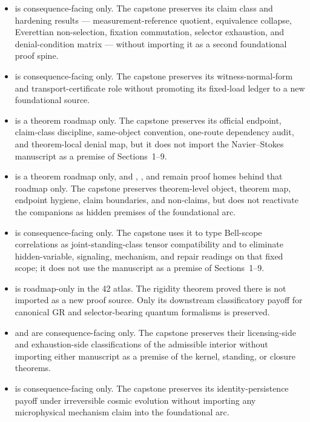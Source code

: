 \begin{itemize}
  \item \measurementdoc{} is consequence-facing only. The capstone preserves its claim class and hardening results --- measurement-reference quotient, equivalence collapse, Everettian non-selection, fixation commutation, selector exhaustion, and denial-condition matrix --- without importing it as a second foundational proof spine.
  \item \structuradoc{} is consequence-facing only. The capstone preserves its witness-normal-form and transport-certificate role without promoting its fixed-load ledger to a new foundational source.
  \item \nsdoc{} is a theorem roadmap only. The capstone preserves its official endpoint, claim-class discipline, same-object convention, one-route dependency audit, and theorem-local denial map, but it does not import the Navier--Stokes manuscript as a premise of Sections~1--9.
  \item \ymmaindoc{} is a theorem roadmap only, and \ymcompanionone{}, \ymcompaniontwo{}, and \ymcompanionthree{} remain proof homes behind that roadmap only. The capstone preserves theorem-level object, theorem map, endpoint hygiene, claim boundaries, and non-claims, but does not reactivate the companions as hidden premises of the foundational arc.
  \item \entanglementdoc{} is consequence-facing only. The capstone uses it to type Bell-scope correlations as joint-standing-class tensor compatibility and to eliminate hidden-variable, signaling, mechanism, and repair readings on that fixed scope; it does not use the manuscript as a premise of Sections~1--9.
  \item \gaugeconstraintdoc{} is roadmap-only in the 42 atlas. The rigidity theorem proved there is not imported as a new proof source. Only its downstream classificatory payoff for canonical GR and selector-bearing quantum formalisms is preserved.
  \item \beginningdoc{} and \interiorenddoc{} are consequence-facing only. The capstone preserves their licensing-side and exhaustion-side classifications of the admissible interior without importing either manuscript as a premise of the kernel, standing, or closure theorems.
  \item \baryogenesisdoc{} is consequence-facing only. The capstone preserves its identity-persistence payoff under irreversible cosmic evolution without importing any microphysical mechanism claim into the foundational arc.

\end{itemize}
